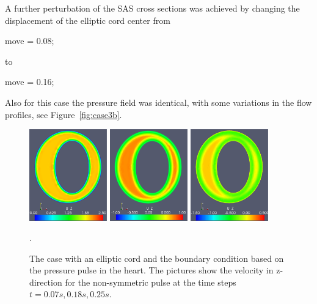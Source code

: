 A further perturbation of the SAS cross sections was achieved by
changing the displacement of the elliptic cord center from
\begin{anycode}
move = 0.08;
\end{anycode}
to
\begin{anycode}
move = 0.16;
\end{anycode}
Also for this case the pressure field was identical, with some
variations in the flow profiles, see Figure~\ref{fig:case3b}.

\begin{figure}\begin{center}
\includegraphics[width=0.3\textwidth]{chapters/hentschel/pdf/pulse_f1_08_elliptic_sysmax_nmb7.pdf}
\includegraphics[width=0.3\textwidth]{chapters/hentschel/pdf/pulse_f1_08_elliptic_sysdia_nmb18.pdf}
\includegraphics[width=0.3\textwidth]{chapters/hentschel/pdf/pulse_f1_08_elliptic_diamin1_nmb25.pdf}
\caption{The case with an elliptic cord and the boundary condition based on
the pressure pulse in the heart. The pictures show the velocity in z-direction for the non-symmetric pulse at
the time steps $t=0.07s, 0.18s, 0.25s$.}
\label{fig:case3}.
\end{center}\end{figure}

